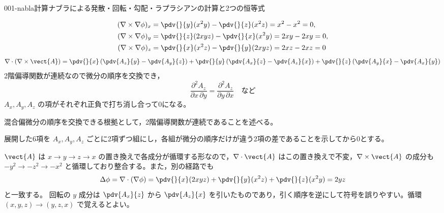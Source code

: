 \documentclass[uplatex,dvipdfmx,a4paper,11pt]{jsarticle}
\begin{document}
\begin{mondai}{001-nabla}{計算}{ナブラによる発散・回転・勾配・ラプラシアンの計算と2つの恒等式}
\begin{tadashii}
\begin{align*}
(\nabla\times\nabla\phi)_x&=\pdv{}{y}(x^2y)-\pdv{}{z}(x^2z)=x^2-x^2=0,\\
(\nabla\times\nabla\phi)_y&=\pdv{}{z}(2xyz)-\pdv{}{x}(x^2y)=2xy-2xy=0,\\
(\nabla\times\nabla\phi)_z&=\pdv{}{x}(x^2z)-\pdv{}{y}(2xyz)=2xz-2xz=0
\end{align*}
\[
\nabla\cdot(\nabla\times\vect{A})=\pdv{}{x}\left(\pdv{A_z}{y}-\pdv{A_y}{z}\right)+\pdv{}{y}\left(\pdv{A_x}{z}-\pdv{A_z}{x}\right)+\pdv{}{z}\left(\pdv{A_y}{x}-\pdv{A_x}{y}\right)
\]
2階偏導関数が連続なので微分の順序を交換でき，
\[
\frac{\partial^2A_z}{\partial x\,\partial y}=\frac{\partial^2A_z}{\partial y\,\partial x}\quad\text{など}
\]
$A_x,A_y,A_z$ の項がそれぞれ正負で打ち消し合って0になる。
\begin{ronten}
  \item {} 混合偏微分の順序を交換できる根拠として，2階偏導関数が連続であることを述べる。
  \item {} 展開した6項を $A_x,A_y,A_z$ ごとに2項ずつ組にし，各組が微分の順序だけが違う2項の差であることを示してから0とする。
\end{ronten}
\kenzan $\vect{A}$ は $x\to y\to z\to x$ の置き換えで各成分が循環する形なので，$\nabla\cdot\vect{A}$ はこの置き換えで不変，$\nabla\times\vect{A}$ の成分も $-y^2\to-z^2\to-x^2$ と循環しており整合する。また，別の経路でも
\[
\Delta\phi=\nabla\cdot(\nabla\phi)=\pdv{}{x}(2xyz)+\pdv{}{y}(x^2z)+\pdv{}{z}(x^2y)=2yz
\]
と一致する。
\tsumazuki 回転の $y$ 成分は $\pdv{A_x}{z}$ から $\pdv{A_z}{x}$ を引いたものであり，引く順序を逆にして符号を誤りやすい。循環 $(x,y,z)\to(y,z,x)$ で覚えるとよい。
\end{tadashii}
\end{mondai}
\end{document}
